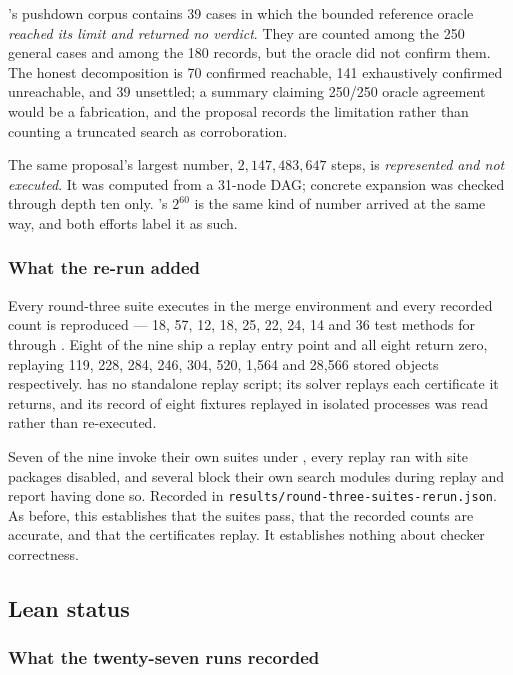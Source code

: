 's pushdown corpus contains 39 cases in which the bounded reference
oracle \emph{reached its limit and returned no verdict}. They are counted among
the 250 general cases and among the 180  records, but the
oracle did not confirm them. The honest decomposition is 70 confirmed
reachable, 141 exhaustively confirmed unreachable, and 39 unsettled; a summary
claiming 250/250 oracle agreement would be a fabrication, and the proposal
records the limitation rather than counting a truncated search as corroboration.

The same proposal's largest number, $2{,}147{,}483{,}647$ steps, is
\emph{represented and not executed}. It was computed from a 31-node DAG;
concrete expansion was checked through depth ten only. 's $2^{60}$ is
the same kind of number arrived at the same way, and both efforts label it as
such.

\subsubsection*{What the re-run added}

Every round-three suite executes in the merge environment and every recorded
count is reproduced --- 18, 57, 12, 18, 25, 22, 24, 14 and 36 test methods for
 through . Eight of the nine ship a replay entry point and all
eight return zero, replaying 119, 228, 284, 246, 304, 520, 1{,}564 and 28{,}566
stored objects respectively.  has no standalone replay script; its
solver replays each certificate it returns, and its record of eight fixtures
replayed in isolated processes was read rather than re-executed.

Seven of the nine invoke their own suites under , every replay
ran with site packages disabled, and several block their own search modules
during replay and report having done so. Recorded in
\texttt{results/round-three-suites-rerun.json}. As before, this establishes that
the suites pass, that the recorded counts are accurate, and that the
certificates replay. It establishes nothing about checker correctness.
\subsection{Lean status}

\subsubsection*{What the twenty-seven runs recorded}

